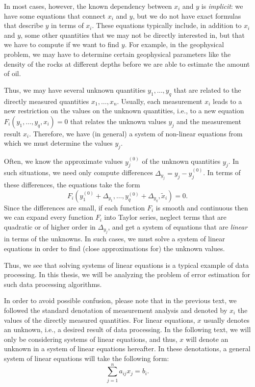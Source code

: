 In most cases, however, the known dependency between $x_i$ and $y$ is
{\it implicit}: we have some equations that connect $x_i$ and $y$, but
we do not have exact formulas that describe $y$ in terms of $x_i$.  These
equations typically include, in addition to $x_i$ and $y$, some other
quantities that we may not be
directly interested in, but that we have to compute if we want to find
$y$. For example, in the geophysical problem, we may have to determine
certain geophysical parameters like the density of the rocks at different
depths before we are able to estimate the amount of oil.

Thus, we may have several unknown quantities $y_1,\ldots,y_q$
that are related to the directly measured quantities
$x_1,\ldots,x_n$. Usually, each measurement $x_i$ leads to a new restriction
on the values on the unknown quantities, i.e., to a new equation
$F_i(y_1,\ldots,y_q,x_i)=0$ that relates the unknown values $y_j$ and
the measurement result $x_i$. Therefore, we have (in general) a system of
non-linear equations from which we must determine the values $y_j$.

Often, we know the approximate values $y^{(0)}_j$ of the unknown
quantities $y_j$. In such situations, we need only compute differences
$\Delta_{y_j}=y_j-y^{(0)}_j$.  In terms of
these differences, the equations take the form
$$F_i(y^{(0)}_1+\Delta_{y_1},\ldots,y^{(0)}_q+\Delta_{y_q},\tilde x_i)=0.$$
Since the differences are small, if each function $F_i$ is smooth and
continuous then we can expand every function $F_i$ into Taylor series,
neglect terms that are quadratic or of higher order in $\Delta_{y_j}$, and
get a system of equations that are {\em linear\/} in terms of the unknowns.
In such cases, we must solve a system of linear equations in order to
find (close approximations for) the unknown values.

Thus, we see that solving systems of linear equations is a typical example of
data processing. In this thesis, we will be analyzing the problem of
error estimation for such data processing algorithms.

In order to avoid possible confusion, please note
that in the previous text, we followed the standard denotation of
measurement analysis and denoted by $x_i$ the
values of the directly measured quantities.
For linear equations, $x$ usually denotes an
unknown, i.e., a desired result of data processing. In the following
text, we will only be considering systems of linear equations, and thus, 
$x$ will denote an unknown in a system of linear equations hereafter. In 
these denotations, a general system of linear equations will take the 
following form: 
\begin{equation}
  \sum_{j=1}^n a_{ij}x_j=b_i.                      \label{eq:sys-lin-eq}
\end{equation}

